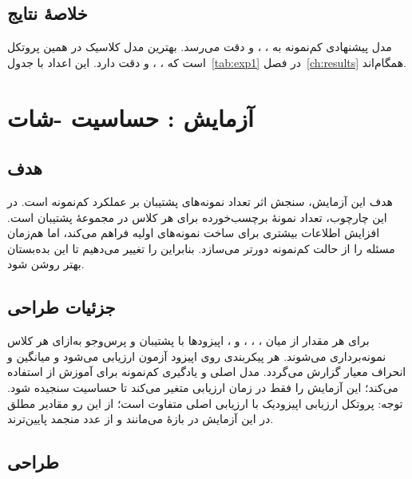 \subsection{خلاصۀ نتایج}

مدل پیشنهادی کم‌نمونه به  ،  ، و دقت  می‌رسد. بهترین مدل کلاسیک در همین پروتکل  است که  ،  ، و دقت  دارد. این اعداد با جدول~\ref{tab:exp1} در فصل~\ref{ch:results} همگام‌اند.

\section{آزمایش : حساسیت -شات}

\subsection{هدف}

هدف این آزمایش، سنجش اثر تعداد نمونه‌های پشتیبان  بر عملکرد کم‌نمونه است. در این چارچوب،  تعداد نمونۀ برچسب‌خورده برای هر کلاس در مجموعۀ پشتیبان است. افزایش  اطلاعات بیشتری برای ساخت نمونه‌های اولیه فراهم می‌کند، اما هم‌زمان مسئله را از حالت کم‌نمونه دورتر می‌سازد. بنابراین  را تغییر می‌دهیم تا این بده‌بستان بهتر روشن شود.

\subsection{جزئیات طراحی}

برای هر مقدار  از میان ، ، ،  و ، اپیزودها با  پشتیبان و  پرس‌وجو به‌ازای هر کلاس نمونه‌برداری می‌شوند. هر پیکربندی روی  اپیزود آزمون ارزیابی می‌شود و میانگین  و انحراف معیار گزارش می‌گردد. مدل اصلی  و یادگیری کم‌نمونه برای آموزش از  استفاده می‌کند؛ این آزمایش  را فقط در زمان ارزیابی متغیر می‌کند تا حساسیت سنجیده شود. توجه: پروتکل ارزیابی اپیزودیک با ارزیابی اصلی  متفاوت است؛ از این رو مقادیر مطلق  در این آزمایش در بازۀ  می‌مانند و از عدد منجمد  پایین‌ترند.

\subsection{طراحی}

